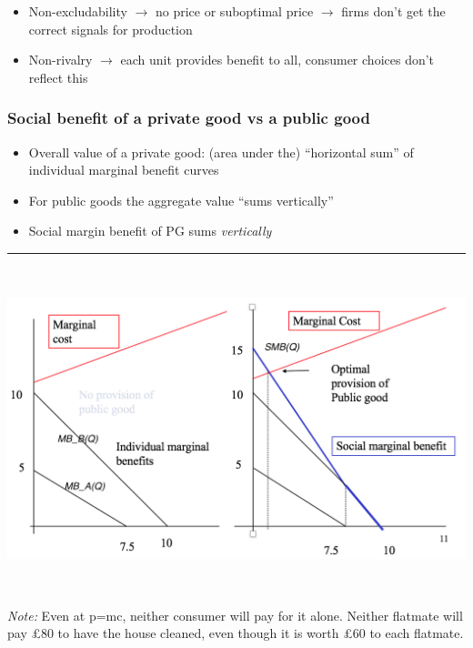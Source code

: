 \documentclass[]{article}
\begin{document}
\begin{itemize}
\item
  Non-excludability \(\rightarrow\) no price or suboptimal price \(\rightarrow\) firms don't get the correct signals for production
\item
  Non-rivalry \(\rightarrow\) each unit provides benefit to all, consumer choices don't reflect this
\end{itemize}

\hypertarget{social-benefit-of-a-private-good-vs-a-public-good}{%
\subsubsection{Social benefit of a private good vs a public good}\label{social-benefit-of-a-private-good-vs-a-public-good}}

\begin{itemize}
\item
  Overall value of a private good: (area under the) ``horizontal sum'' of individual marginal benefit curves
\item
  For public goods the aggregate value ``sums vertically''
\item
  Social margin benefit of PG sums \emph{vertically}
\end{itemize}

\begin{center}\rule{0.5\linewidth}{\linethickness}\end{center}

\includegraphics[height=3.7in]{picsfigs/pgprovision1.png}

\emph{Note:} Even at p=mc, neither consumer will pay for it alone. Neither flatmate will pay £80 to have the house cleaned, even though it is worth £60 to each flatmate.\\
\end{document}
